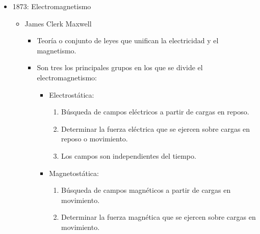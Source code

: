 \documentclass[a4paper,10pt]{article}
\begin{document}
\begin{itemize}
\begin{itemize}
    \end{itemize}

\item 1873: Electromagnetismo

    \begin{itemize}
        
    \item James Clerk Maxwell

        \begin{itemize}
            
        \item Teoría o conjunto de leyes que unifican la electricidad y el
            magnetismo.
            
        \item Son tres los principales grupos en los que se divide el electromagnetismo: 
            
            \begin{itemize}
                
            \item Electrostática:
            
                \begin{enumerate} 
                    
                \item Búsqueda de campos eléctricos a partir de
                    cargas en reposo. 
                    
                \item Determinar la fuerza eléctrica que se
                ejercen sobre cargas en reposo o movimiento.
                
                \item Los campos son independientes del tiempo.
                
                \end{enumerate}

            \item Magnetostática:
            
                \begin{enumerate}
                    
                \item Búsqueda de campos magnéticos a partir de
                cargas en movimiento.
                
                \item Determinar la fuerza magnética que se
                ejercen sobre cargas en movimiento.
                

\end{enumerate}
\end{itemize}
\end{itemize}
\end{itemize}
\end{itemize}
\end{document}
